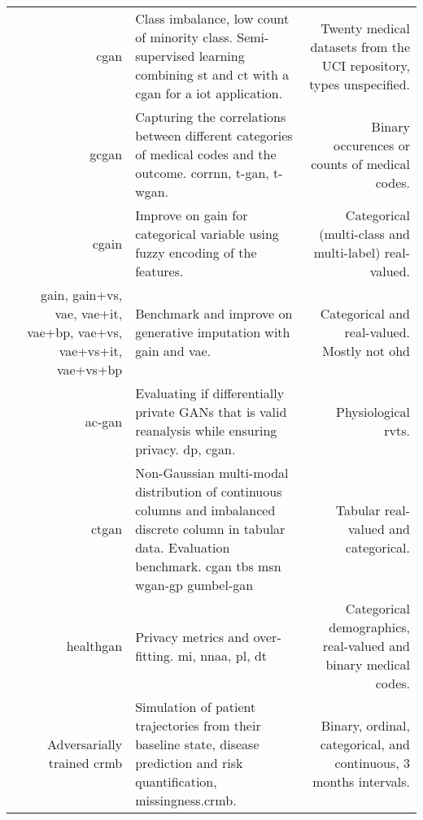 \begin{center}
\begin{longtable}[l]{@{}p{}NMR@{}}
        \citeauthor{Yang_2019_cdss} & \gls{cgan}
        & Class imbalance, low count of minority class. Semi-supervised learning combining \gls{st} and \gls{ct} with a \gls{cgan} for a \gls{iot} application.
        & Twenty medical datasets from the UCI repository, types unspecified.\\
        
        \citeauthor{Yang_2019_ehr} & \gls{gcgan}
        & Capturing the correlations between different categories of medical codes and the outcome.  \gls{corrnn}, \gls{t-gan}, \gls{t-wgan}.
        & Binary occurences or counts of medical codes.\\
        
        \citeauthor{Yang_2019_impute_ehr} & \gls{cgain}
        & Improve on \gls{gain} for categorical variable using fuzzy encoding of the features. 
        & Categorical (multi-class and multi-label) real-valued.\\
        
        \citeauthor{Camino2019} & \gls{gain}, \gls{gain}+\gls{vs}, \gls{vae}, \gls{vae}+\gls{it}, \gls{vae}+\gls{bp},  \gls{vae}+\gls{vs},  \gls{vae}+\gls{vs}+\gls{it}, \gls{vae}+\gls{vs}+\gls{bp}
        & Benchmark and improve on generative imputation with \gls{gain} and \gls{vae}. & Categorical and real-valued. Mostly not \gls{ohd}\\
        
        \citeauthor{Beaulieu-Jones2019-ct} & \gls{ac-gan} 
        & Evaluating if differentially private GANs that is valid reanalysis while ensuring privacy.  \gls{dp}, \gls{cgan}.
        & Physiological \gls{rvts}.\\
        
        \citeauthor{Xu2019-ay} & \gls{ctgan}
        & Non-Gaussian multi-modal distribution of continuous columns and imbalanced discrete column in tabular data. Evaluation benchmark.  \gls{cgan} \gls{tbs} \gls{msn} \gls{wgan-gp} \gls{gumbel-gan}
        & Tabular real-valued and categorical.\\
        
        \citeauthor{yale2019ESANN} & \gls{healthgan}
        & Privacy metrics and over-fitting.  \gls{mi}, \gls{nnaa}, \gls{pl}, \gls{dt}
        & Categorical demographics, real-valued and binary medical codes.\\
        
        \citeauthor{Fisher2019} & Adversarially trained \gls{crmb}
        & Simulation of patient trajectories from their baseline state, disease prediction and risk quantification, missingness.\gls{crmb}.
        &  Binary, ordinal, categorical, and continuous, 3 months intervals.\\
        

\end{longtable}
\end{center}
